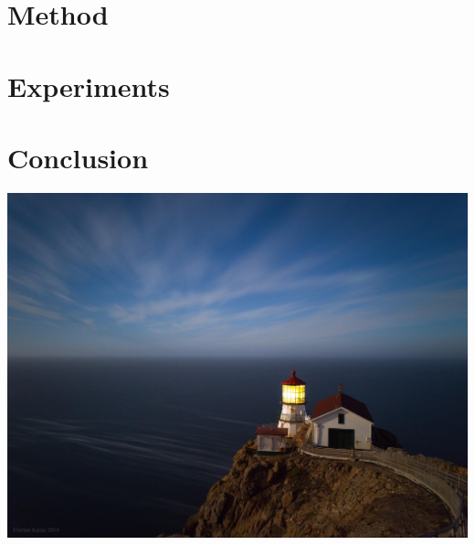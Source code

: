 \documentclass[10pt,twocolumn,letterpaper]{article}
\begin{document}
\section{Method}
\section{Experiments}
\section{Conclusion}



\includegraphics[width=0.8\linewidth]{./immagini/app-google-foto-notte-5.jpg}



{\small


}
\end{document}
